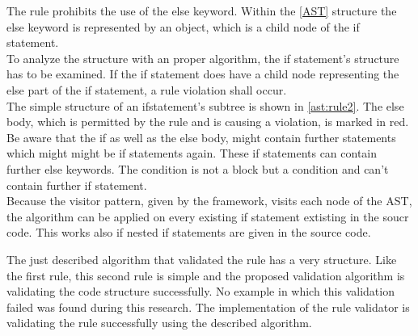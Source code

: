 The rule prohibits the use of the else keyword. Within the \ref{AST} structure the else keyword is represented by an object, which is a child node of the if statement.
\\

To analyze the structure with an proper algorithm, the if statement's structure has to be examined. If the if statement does have a child node representing the else part of the if statement, a rule violation shall occur.
\\

The simple structure of an ifstatement's subtree is shown in \ref{ast:rule2}. The else body, which is permitted by the rule and is causing a violation, is marked in red. 
Be aware that the if as well as the else body, might contain further statements which might might be if statements again. These if statements can contain further else keywords. The condition is not a block but a condition and can't contain further if statement.
\\

Because the visitor pattern, given by the framework, visits each node of the \acf{AST}, the algorithm can be applied on every existing if statement extisting in the soucr code. This works also if nested if statements are given in the source code.
\\

\label{ast:rule2}

The just described algorithm that validated the rule has a very structure. Like the first rule, this second rule is simple and the proposed validation algorithm is validating the code structure successfully. No example in which this validation failed was found during this research. The implementation of the rule validator is validating the rule successfully using the described algorithm.

